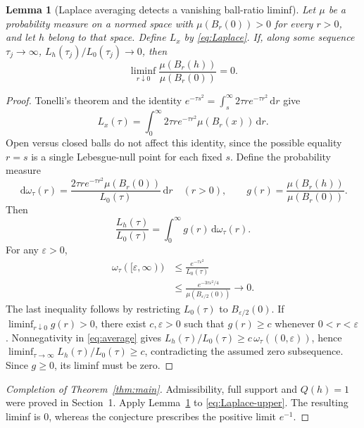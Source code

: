 \documentclass[11pt]{article}
\newtheorem{lemma}[theorem]{Lemma}
\theoremstyle{remark}
\newcommand{\dd}{\,\mathrm d}
\begin{document}
\begin{lemma}[Laplace averaging detects a vanishing ball-ratio liminf]\label{lem:bridge}
Let $\mu$ be a probability measure on a normed space with $\mu(B_r(0))>0$ for every $r>0$, and let $h$ belong to that space. Define $L_x$ by \eqref{eq:Laplace}. If, along some sequence $\tau_j\to\infty$,
$L_h(\tau_j)/L_0(\tau_j)\to0$, then
\[
\liminf_{r\downarrow0}\frac{\mu(B_r(h))}{\mu(B_r(0))}=0.
\]
\end{lemma}
\begin{proof}
Tonelli's theorem and the identity
$e^{-\tau s^2}=\int_s^\infty2\tau r e^{-\tau r^2}\dd r$
give
\begin{equation}\label{eq:layercake}
L_x(\tau)=\int_0^\infty2\tau r e^{-\tau r^2}\mu(B_r(x))\dd r.
\end{equation}
Open versus closed balls do not affect this identity, since the possible equality $r=s$ is a single Lebesgue-null point for each fixed $s$.
Define the probability measure
\[
\dd\omega_\tau(r)=\frac{2\tau r e^{-\tau r^2}\mu(B_r(0))}{L_0(\tau)}\dd r
\quad (r>0),
\qquad g(r)=\frac{\mu(B_r(h))}{\mu(B_r(0))}.
\]
Then
\begin{equation}\label{eq:average}
\frac{L_h(\tau)}{L_0(\tau)}=\int_0^\infty g(r)\dd\omega_\tau(r).
\end{equation}
For any $\varepsilon>0$,
\begin{equation}\label{eq:concentration}
\begin{aligned}
\omega_\tau([\varepsilon,\infty))
&\le\frac{e^{-\tau\varepsilon^2}}{L_0(\tau)}\\
&\le\frac{e^{-3\tau\varepsilon^2/4}}{\mu(B_{\varepsilon/2}(0))}
\longrightarrow0.
\end{aligned}
\end{equation}
The last inequality follows by restricting $L_0(\tau)$ to $B_{\varepsilon/2}(0)$.
If $\liminf_{r\downarrow0}g(r)>0$, there exist $c,\varepsilon>0$ such that $g(r)\ge c$ whenever $0<r<\varepsilon$. Nonnegativity in \eqref{eq:average} gives
$L_h(\tau)/L_0(\tau)\ge c\,\omega_\tau((0,\varepsilon))$, hence $\liminf_{\tau\to\infty}L_h(\tau)/L_0(\tau)\ge c$, contradicting the assumed zero subsequence. Since $g\ge0$, its liminf must be zero.
\end{proof}

\begin{proof}[Completion of Theorem~\ref{thm:main}]
Admissibility, full support and $Q(h)=1$ were proved in Section~1. Apply Lemma~\ref{lem:bridge} to \eqref{eq:Laplace-upper}. The resulting liminf is $0$, whereas the conjecture prescribes the positive limit $e^{-1}$.
\end{proof}
\end{document}
